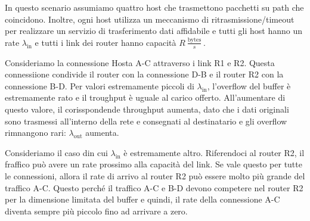 \documentclass{book}
\newcommand{\tmop}[1]{\ensuremath{\operatorname{#1}}}
\begin{document}
{}

In questo scenario assumiamo quattro host che trasmettono pacchetti su path
che coincidono. Inoltre, ogni host utilizza un meccanismo di
ritrasmissione/timeout per realizzare un servizio di trasferimento dati
affidabile e tutti gli host hanno un rate $\lambda_{\tmop{in}}$ e tutti i link
dei router hanno capacit{\`a} $R \frac{\tmop{bytes}}{s}$.

Consideriamo la connessione Hosta A-C attraverso i link R1 e R2. Questa
connessiione condivide il router con la connessione D-B e il router R2 con la
connessione B-D. Per valori estremamente piccoli di $\lambda_{\tmop{in}}$,
l'overflow del buffer {\`e} estremamente rato e il troughput {\`e} uguale al
carico offerto. All'aumentare di questo valore, il corisspondende throughput
aumenta, dato che i dati originali sono trasmessi all'interno della rete e
consegnati al destinatario e gli overflow rimnangono rari:
$\lambda_{\tmop{out}} $ aumenta.

Consideriamo il caso din cui $\lambda_{\tmop{in}}$ {\`e} estremamente altro.
Riferendoci al router R2, il fraffico pu{\`o} avere un rate prossimo alla
capacit{\`a} del link. Se vale questo per tutte le connessioni, allora il rate
di arrivo al router R2 pu{\`o} essere molto pi{\`u} grande del traffico A-C.
Questo perch{\'e} il traffico A-C e B-D devono competere nel router R2 per la
dimensione limitata del buffer e quindi, il rate della connessione A-C diventa
sempre pi{\`u} piccolo fino ad arrivare a zero.
\end{document}
